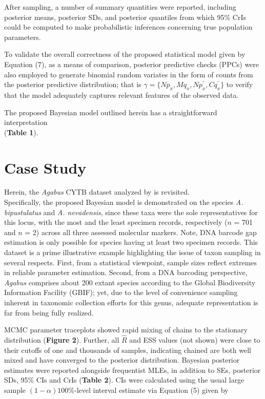 \documentclass[12pt]{article}
\begin{document}
After sampling, a number of summary quantities were reported, including posterior means, posterior SDs, and posterior quantiles from which 95\% CrIs could be computed to make probabilistic inferences concerning true population parameters.

To validate the overall correctness of the proposed statistical model given by Equation (7), as a means of comparison, posterior predictive checks (PPCs) were also employed to generate binomial random variates in the form of counts from the posterior predictive distribution; that is $\gamma = \{Np_x, Mq_x, Np^{'}_x, Cq^{'}_x\}$ to verify that the model adequately captures relevant features of the observed data. 

The proposed Bayesian model outlined herein has a straightforward interpretation \\ (\textbf{Table 1}). 

\section{Case Study}

Herein, the \textit{Agabus} CYTB dataset analyzed by \citet{phillips2024measure} is revisited. \\ Specifically, the proposed Bayesian model is demonstrated on the species \textit{A. bipustulatus} and \textit{A. nevadensis}, since these taxa were the sole representatives for this locus, with the most and the least specimen records, respectively ($n$ = 701 and $n$ = 2) across all three assessed molecular markers. Note, DNA barcode gap estimation is only possible for species having at least two specimen records. This dataset is a prime illustrative example highlighting the issue of taxon sampling in several respects. First, from a statistical viewpoint, sample sizes reflect extremes in reliable parameter estimation. Second, from a DNA barcoding perspective, \textit{Agabus} comprises about 200 extant species according to the Global Biodiversity Information Facility (GBIF); yet, due to the level of convenience sampling inherent in taxonomic collection efforts for this genus, adequate representation is far from being fully realized. 

MCMC parameter traceplots showed rapid mixing of chains to the stationary distribution (\textbf{Figure 2}). Further, all $\hat{R}$ and ESS values (not shown) were close to their cutoffs of one and thousands of samples, indicating chained are both well mixed and have converged to the posterior distribution.  Bayesian posterior estimates were reported alongside frequentist MLEs, in addition to SEs, posterior SDs, 95\% CIs and CrIs (\textbf{Table 2}). CIs were calculated using the usual large sample  $(1-\alpha)100\%$-level interval estimate via Equation (5) given by
\end{document}
